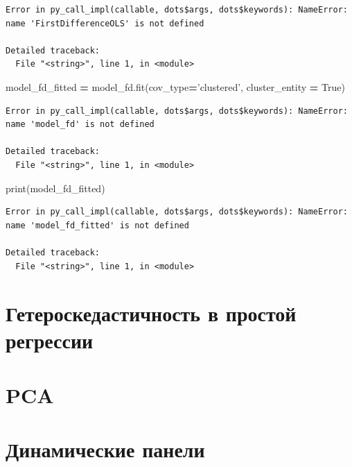 \documentclass[]{book}
\newenvironment{Shaded}{\begin{snugshade}}{\end{snugshade}}
\newcommand{\BuiltInTok}[1]{#1}
\newcommand{\NormalTok}[1]{#1}
\newcommand{\OperatorTok}[1]{\textcolor[rgb]{0.81,0.36,0.00}{\textbf{#1}}}
\newcommand{\StringTok}[1]{\textcolor[rgb]{0.31,0.60,0.02}{#1}}
\newcommand{\VariableTok}[1]{\textcolor[rgb]{0.00,0.00,0.00}{#1}}
\begin{document}
\begin{verbatim}
Error in py_call_impl(callable, dots$args, dots$keywords): NameError: name 'FirstDifferenceOLS' is not defined

Detailed traceback: 
  File "<string>", line 1, in <module>
\end{verbatim}

\begin{Shaded}
\begin{Highlighting}[]
\NormalTok{model_fd_fitted }\OperatorTok{=}\NormalTok{ model_fd.fit(cov_type}\OperatorTok{=}\StringTok{'clustered'}\NormalTok{, cluster_entity }\OperatorTok{=} \VariableTok{True}\NormalTok{)}
\end{Highlighting}
\end{Shaded}

\begin{verbatim}
Error in py_call_impl(callable, dots$args, dots$keywords): NameError: name 'model_fd' is not defined

Detailed traceback: 
  File "<string>", line 1, in <module>
\end{verbatim}

\begin{Shaded}
\begin{Highlighting}[]
\BuiltInTok{print}\NormalTok{(model_fd_fitted)}
\end{Highlighting}
\end{Shaded}

\begin{verbatim}
Error in py_call_impl(callable, dots$args, dots$keywords): NameError: name 'model_fd_fitted' is not defined

Detailed traceback: 
  File "<string>", line 1, in <module>
\end{verbatim}

\hypertarget{heterosked}{%
\chapter{Гетероскедастичность в простой регрессии}\label{heterosked}}

\hypertarget{pca}{%
\chapter{PCA}\label{pca}}

\hypertarget{dinpanel}{%
\chapter{Динамические панели}\label{dinpanel}}
\end{document}

